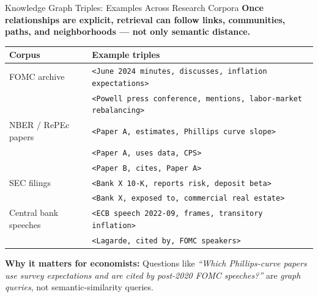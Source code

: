 \begin{frame}{Knowledge Graph Triples: Examples Across Research Corpora}
\small
\textbf{Once relationships are explicit, retrieval can follow links, communities, paths, and neighborhoods --- not only semantic distance.}

\vspace{0.1cm}
\begin{center}
\footnotesize
\begin{tabular}{|p{3.8cm}|p{8.6cm}|}
\hline
\textbf{Corpus} & \textbf{Example triples} \\ \hline
FOMC archive & \texttt{<June 2024 minutes, discusses, inflation expectations>} \\
             & \texttt{<Powell press conference, mentions, labor-market rebalancing>} \\ \hline
NBER / RePEc papers & \texttt{<Paper A, estimates, Phillips curve slope>} \\
                    & \texttt{<Paper A, uses data, CPS>} \\
                    & \texttt{<Paper B, cites, Paper A>} \\ \hline
SEC filings & \texttt{<Bank X 10-K, reports risk, deposit beta>} \\
            & \texttt{<Bank X, exposed to, commercial real estate>} \\ \hline
Central bank speeches & \texttt{<ECB speech 2022-09, frames, transitory inflation>} \\
                      & \texttt{<Lagarde, cited by, FOMC speakers>} \\ \hline
\end{tabular}
\end{center}

\vspace{0.05cm}
\textbf{Why it matters for economists:} Questions like \emph{``Which Phillips-curve papers use survey expectations and are cited by post-2020 FOMC speeches?''} are \emph{graph queries}, not semantic-similarity queries.
\end{frame}

